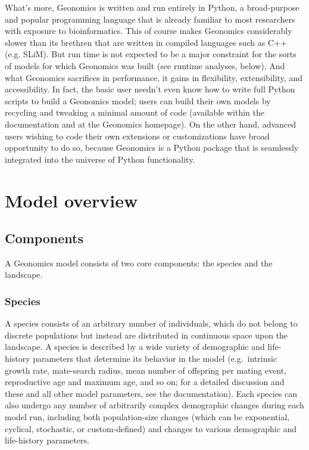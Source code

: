 ﻿\documentclass{article}
\begin{document}
What's more, Geonomics is written and run entirely in Python, a broad-purpose and popular
programming language that is already familiar to most researchers with exposure to bioinformatics.
This of course makes Geonomics considerably slower than its brethren that are
written in compiled languages such as C++ (e.g. SLiM). 
But run time is not expected to be a major constraint for the sorts of models
for which Geonomics was built (see runtime analyses, below). 
And what Geonomics sacrifices in performance, it gains in flexibility, extensibility, and accessibility.
In fact, the basic user needn't even know how to write full Python scripts to 
build a Geonomics model; users can build their own models by recycling and tweaking
a minimal amount of code (available within the documentation and at the Geonomics homepage).
On the other hand, advanced users wishing to code their own extensions or customizations
have broad opportunity to do so, because Geonomics is a Python package that is seamlessly
integrated into the universe of Python functionality.


\section{Model overview}

\subsection{Components}
A Geonomics model consists of two core components: the species and the landscape.

\subsubsection{Species}
A species consists of an arbitrary number of individuals, which do not belong to
discrete populations but instead are distributed in continuous space upon the landscape.
A species is described by a wide variety of demographic and life-history parameters
that determine its behavior in the model (e.g.\ intrinsic growth rate, mate-search radius,
mean number of offspring per mating event, reproductive age and maximum age, and so on;
for a detailed discussion and these and all other model parameters, see the documentation).
Each species can also undergo any number of arbitrarily complex demographic changes during
each model run, including both population-size changes
(which can be exponential, cyclical, stochastic, or custom-defined)
and changes to various demographic and life-history parameters.
\end{document}
